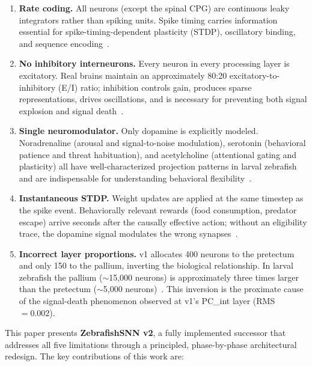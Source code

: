 \documentclass[11pt,a4paper]{article}
\begin{document}
\begin{enumerate}[nosep,leftmargin=2em]
  \item \textbf{Rate coding.}
    All neurons (except the spinal CPG) are continuous leaky integrators
    rather than spiking units.
    Spike timing carries information essential for spike-timing-dependent
    plasticity (STDP), oscillatory binding, and sequence
    encoding~\cite{mainen1995}.
  \item \textbf{No inhibitory interneurons.}
    Every neuron in every processing layer is excitatory.
    Real brains maintain an approximately 80:20 excitatory-to-inhibitory
    (E/I) ratio; inhibition controls gain, produces sparse representations,
    drives oscillations, and is necessary for preventing both signal
    explosion and signal death~\cite{carandini2012}.
  \item \textbf{Single neuromodulator.}
    Only dopamine is explicitly modeled.
    Noradrenaline (arousal and signal-to-noise modulation), serotonin
    (behavioral patience and threat habituation), and acetylcholine
    (attentional gating and plasticity) all have well-characterized
    projection patterns in larval zebrafish and are indispensable
    for understanding behavioral flexibility~\cite{jesuthasan2012}.
  \item \textbf{Instantaneous STDP.}
    Weight updates are applied at the same timestep as the spike event.
    Behaviorally relevant rewards (food consumption, predator escape)
    arrive seconds after the causally effective action; without an
    eligibility trace, the dopamine signal modulates the wrong
    synapses~\cite{fremaux2016}.
  \item \textbf{Incorrect layer proportions.}
    v1 allocates 400 neurons to the pretectum and only 150 to the pallium,
    inverting the biological relationship.
    In larval zebrafish the pallium ($\sim$15,000 neurons) is approximately
    three times larger than the pretectum ($\sim$5,000
    neurons)~\cite{broglio2015}.
    This inversion is the proximate cause of the signal-death phenomenon
    observed at v1's PC\_int layer (RMS~$= 0.002$).
\end{enumerate}

This paper presents \textbf{ZebrafishSNN v2}, a fully implemented successor
that addresses all five limitations through a principled, phase-by-phase
architectural redesign.
The key contributions of this work are:
\end{document}
